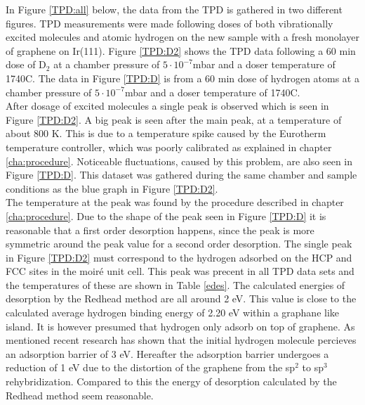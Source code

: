 In Figure \ref{TPD:all} below, the data from the TPD is gathered in two different figures. TPD measurements were made following doses of both vibrationally excited molecules and atomic hydrogen on the new sample with a fresh monolayer of graphene on Ir(111). Figure \ref{TPD:D2} shows the TPD data following a 60 min dose of D$_2$ at a chamber pressure of $5\cdot 10^{-7}$mbar and a doser temperature of 1740\degree C. The data in Figure \ref{TPD:D} is from a 60 min dose of hydrogen atoms at a chamber pressure of $5\cdot 10^{-7}$mbar and a doser temperature of 1740\degree C.\\
After dosage of excited molecules a single peak is observed which is seen in Figure \ref{TPD:D2}. A big peak is seen after the main peak, at a temperature of about 800 K. This is due to a temperature spike caused by the Eurotherm temperature controller, which was poorly calibrated as explained in chapter \ref{cha:procedure}. Noticeable fluctuations, caused by this problem, are also seen in Figure \ref{TPD:D}. This dataset was gathered during the same chamber and sample conditions as the blue graph in Figure \ref{TPD:D2}.\\
The temperature at the peak was found by the procedure described in chapter \ref{cha:procedure}. Due to the shape of the peak seen in Figure \ref{TPD:D} it is reasonable that a first order desorption happens, since the peak is more symmetric around the peak value for a second order desorption.\cite{berlinslides} The single peak in Figure \ref{TPD:D2} must correspond to the hydrogen adsorbed on the HCP and FCC sites in the moiré unit cell. This peak was precent in all TPD data sets and the temperatures of these are shown in Table \ref{edes}. The calculated energies of desorption by the Redhead method are all around 2 eV. This value is close to the calculated average hydrogen binding energy of 2.20 eV\cite{balog2013controlling} within a graphane like island. It is however presumed that hydrogen only adsorb on top of graphene. As mentioned recent research has shown that the initial hydrogen molecule percieves an adsorption barrier of 3 eV. Hereafter the adsorption barrier undergoes a reduction of 1 eV due to the distortion of the graphene from the sp$^2$ to sp$^3$ rehybridization.\cite{Lineunpublished} Compared to this the energy of desorption calculated by the Redhead method seem reasonable.\\
\begin{table}
  \centering
  \caption{}
  \label{edes}
\end{table}

